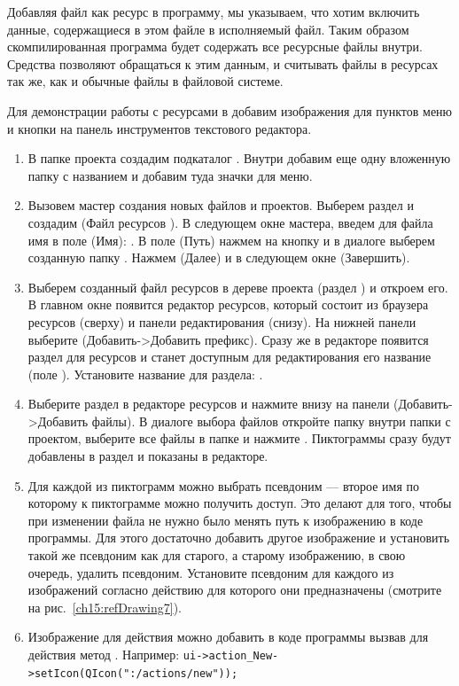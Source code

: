 Добавляя файл как ресурс в программу, мы указываем, что хотим включить данные, содержащиеся в этом файле
в исполняемый файл. Таким образом скомпилированная программа будет содержать все ресурсные файлы внутри. Средства 
позволяют обращаться к этим данным, и считывать файлы в ресурсах так же, как и обычные файлы в файловой системе. 

Для демонстрации работы с ресурсами в  добавим изображения для пунктов меню и кнопки на панель инструментов текстового
редактора. 

\begin{enumerate}
\item В папке проекта создадим подкаталог . Внутри добавим еще одну вложенную папку с названием
 и добавим туда значки для меню. 
\item Вызовем мастер создания новых файлов и проектов. Выберем раздел  и создадим
 (Файл ресурсов ). В следующем окне мастера, 
введем для файла имя в поле  (Имя): . В поле  (Путь) нажмем на 
кнопку и в диалоге выберем созданную папку . Нажмем  (Далее) и в 
следующем окне  (Завершить). 
\item Выберем созданный файл ресурсов в дереве проекта (раздел ) и откроем его. В главном
окне  появится редактор ресурсов, который состоит из браузера ресурсов (сверху) и панели редактирования
(снизу). На нижней панели выберите  (Добавить->Добавить префикс). Сразу же
в редакторе появится раздел для ресурсов и станет доступным для редактирования его название (поле
). Установите название для раздела: . 
\item Выберите раздел  в редакторе ресурсов и нажмите внизу на панели 
 (Добавить->Добавить файлы). В диалоге выбора файлов откройте папку  внутри папки с
проектом, выберите все файлы в папке и нажмите . Пиктограммы сразу будут добавлены в раздел и
показаны в редакторе. 
\item Для каждой из пиктограмм можно выбрать псевдоним --- второе имя по которому к пиктограмме 
можно получить доступ. Это
делают для того, чтобы при изменении файла не нужно было менять путь к изображению в коде программы. 
Для этого
достаточно добавить другое изображение и установить такой же псевдоним как для старого, а старому 
изображению, в свою
очередь, удалить псевдоним. Установите псевдоним для каждого из изображений согласно действию для которого они
предназначены (смотрите на рис.~\ref{ch15:refDrawing7}).
\item Изображение для действия можно добавить в коде программы вызвав для действия метод
. Например: \lstinline!ui->action_New->setIcon(QIcon(":/actions/new"));! 


\end{enumerate}
